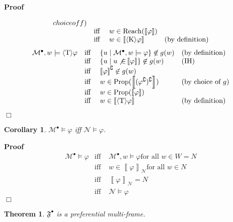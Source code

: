 \documentclass{article}
\newcommand{\nin}{\not\in}
\newcommand{\tmmathbf}[1]{\ensuremath{\boldsymbol{#1}}}
\newcommand{\tmop}[1]{\ensuremath{\operatorname{#1}}}
\newcommand{\tmtextbf}[1]{\text{{\bfseries{#1}}}}
\newenvironment{proof}{\noindent\textbf{Proof\ }}{\hspace*{\fill}$\Box$\medskip}
\newtheorem{corollary}{Corollary}
\newtheorem{theorem}{Theorem}
\newcommand{\Model}{\mathcal{M}}
\newcommand{\Net}{\ensuremath{\mathcal{N}}}
\newcommand{\semantics}[1]{\left\llbracket #1 \right\rrbracket}
\newcommand{\diaKnow}{\langle \tmmathbf{\text{K}} \rangle}
\newcommand{\diaTyp}{\langle \tmmathbf{\text{T}} \rangle}
\newcommand{\Reach}{\textsf{\tmop{Reach}}}
\newcommand{\Prop}{\textsf{\tmop{Prop}}}
\begin{document}
\begin{proof}
\begin{description}
\[\begin{array}{lcll}
{         choice of } f)\\
         & \text{iff } & w \in \Reach (\semantics{\varphi}) & \\
         & \text{iff } & w \in \semantics{\diaKnow \varphi} & \text{(by
         definition)}
       \end{array} \]
    \tmtextbf{$\diaTyp \varphi$ case:}
    \[ \begin{array}{lcll}
         \Model^{\bullet}, w \models \diaTyp \varphi & \text{iff } & \left\{ u
         \mid \Model^{\bullet}, w \models \varphi \right\} \nin g (w) &
         \text{(by definition)}\\
         & \text{iff } & \left\{ u \mid u \not{\in} \semantics{\varphi}
         \right\} \nin g (w) & \text{(IH)}\\
         & \text{iff } & \semantics{\varphi}^{\complement} \nin g (w) & \\
         & \text{iff } & w \in \Prop
         (\semantics{(\varphi^{\complement})^{\complement}}) & \text{(by
         choice of } g)\\
         & \text{iff } & w \in \Prop (\semantics{\varphi}) & \\
         & \text{iff } & w \in \semantics{\diaTyp \varphi} & \text{(by
         definition)}
       \end{array} \]
  \end{description}
\end{proof}

\begin{corollary}
  $\Model^{\bullet} \models \varphi$ iff $\Net \models \varphi$.
\end{corollary}

\begin{proof}
  \[ \begin{array}{lcl}
       \Model^{\bullet} \models \varphi & \text{iff } & \Model^{\bullet}, w
       \models \varphi \text{for all } w \in W = N\\
       & \text{iff } & w \in \semantics{\varphi}_{\Net} \text{for all } w \in
       N\\
       & \text{iff } & \semantics{\varphi}_{\Net} = N\\
       & \text{iff } & \Net \models \varphi
     \end{array} \]
\end{proof}

\begin{theorem}
  $\mathfrak{F}^{\bullet}$ is a preferential multi-frame.
\end{theorem}
\end{document}
